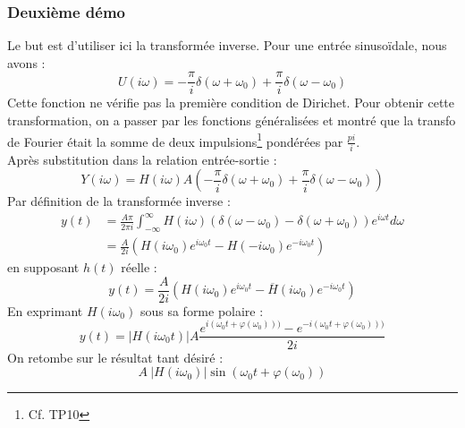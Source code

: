 		\subsubsection{Deuxième démo}
		Le but est d'utiliser ici la transformée inverse. Pour une entrée sinusoïdale, nous
		avons :
		\begin{equation}
		U(i\omega) = -\frac{\pi}{i}\delta(\omega+\omega_0) + \frac{\pi}{i}\delta(\omega-
		\omega_0)
		\label{eq:ExpErr}
		\end{equation}
		Cette fonction ne vérifie pas la première condition de Dirichet. Pour obtenir cette 
		transformation, on a passer par les fonctions généralisées et montré que la transfo 
		de Fourier était la somme de deux impulsions\footnote{Cf. TP10} pondérées par 
		$\frac{pi}{i}$.\\
		Après substitution dans la relation entrée-sortie :
		\begin{equation}
		Y(i\omega) = H(i\omega)A\left(-\frac{\pi}{i}\delta(\omega+\omega_0) + \frac{\pi}{i}
		\delta(\omega-\omega_0)\right)
		\end{equation}
		Par définition de la transformée inverse :
		\begin{equation}
		\begin{array}{ll}
		y(t) &= \frac{A\pi}{2\pi i}\int_{-\infty}^\infty H(i\omega)(\delta(\omega-\omega_0)-
		\delta(\omega+\omega_0))e^{i\omega t}d\omega\\
		 &= \frac{A}{2i}(H(i\omega_0)e^{i\omega_0t} - H(-i\omega_0)e^{-i\omega_0t})
		\end{array}
		\end{equation}
		en supposant $h(t)$ réelle :
		\begin{equation}
		y(t) = \frac{A}{2i}(H(i\omega_0)e^{i\omega_0t} - \overline{H}(i\omega_0)e^{-i\omega_0t})
		\end{equation}
		En exprimant $H(i\omega_0)$ sous sa forme polaire :
		\begin{equation}
		y(t) = |H(i\omega_0t)|A\frac{e^{i(\omega_0t+\varphi(\omega_0)))}-e^{-i(\omega_0t+\varphi
		(\omega_0)))}}{2i}
		\end{equation}
		On retombe sur le résultat tant désiré :	
		\begin{equation}
		A\ |H(i\omega_0)|\sin(\omega_0t+\varphi(\omega_0))
		\end{equation}
		
